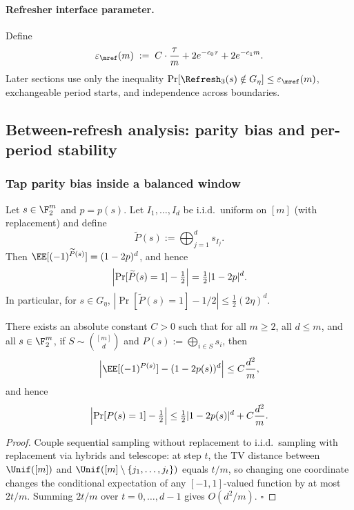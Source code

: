 \paragraph{Refresher interface parameter.}
Define
\[
\varepsilon_{\mref}(m)
\;:=\;
C\cdot \frac{\tau}{m} + 2e^{-c_0\tau}+2e^{-c_1 m}.
\]
Later sections use only the inequality \(\Pr[\Refresh_3(s)\notin G_\eta]\le \varepsilon_{\mref}(m)\),
exchangeable period starts, and independence across boundaries.

\subsection{Between-refresh analysis: parity bias and per-period stability}
\label{sec:between-refresh-analysis}

\subsubsection{Tap parity bias inside a balanced window}

\begin{lemma}
\label{lem:parity-bias-with-replacement}
Let \(s\in\F_2^m\) and \(p=p(s)\). Let \(I_1,\dots,I_d\) be i.i.d.\ uniform on \([m]\) (with replacement) and define
\[
\widetilde{P}(s):=\bigoplus_{j=1}^d s_{I_j}.
\]
Then \(\EE[(-1)^{\widetilde{P}(s)}]=(1-2p)^d\), and hence
\[
\Bigl|\Pr[\widetilde{P}(s)=1]-\tfrac12\Bigr|=\tfrac12|1-2p|^d.
\]
In particular, for \(s\in G_\eta\),
\(
|\Pr[\widetilde{P}(s)=1]-1/2|\le \tfrac12(2\eta)^d.
\)
\end{lemma}

\begin{lemma}
\label{lem:parity-bias-without-replacement}
There exists an absolute constant \(C>0\) such that for all \(m\ge 2\), all \(d\le m\), and all \(s\in\F_2^m\),
if \(S\sim\binom{[m]}{d}\) and \(P(s):=\bigoplus_{i\in S}s_i\), then
\[
\Bigl|\EE[(-1)^{P(s)}]-(1-2p(s))^d\Bigr|\le C\frac{d^2}{m},
\]
and hence
\[
\Bigl|\Pr[P(s)=1]-\tfrac12\Bigr|\le \tfrac12|1-2p(s)|^d + C\frac{d^2}{m}.
\]
\end{lemma}

\begin{proof}
Couple sequential sampling without replacement to i.i.d.\ sampling with replacement via hybrids and telescope:
at step \(t\), the TV distance between \(\Unif([m])\) and \(\Unif([m]\setminus\{j_1,\dots,j_t\})\) equals \(t/m\),
so changing one coordinate changes the conditional expectation of any \([-1,1]\)-valued function by at most \(2t/m\).
Summing \(2t/m\) over \(t=0,\dots,d-1\) gives \(O(d^2/m)\). \(\square\)
\end{proof}

